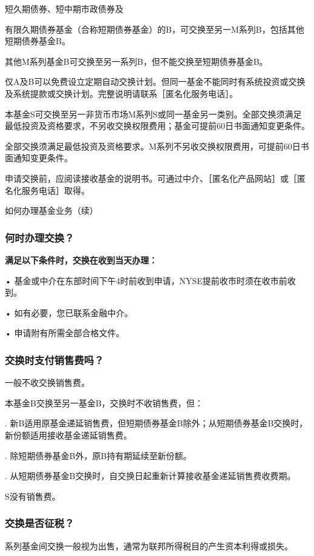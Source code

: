 \documentclass[UTF8,fontset=none,11pt,a4paper]{ctexart}
\begin{document}
短久期债券、短中期市政债券及

有限久期债券基金（合称短期债券基金）的B，可交换至另一M系列B，包括其他短期债券基金B。

其他M系列基金B可交换至另一系列B，但不能交换至短期债券基金B。

仅A及B可以免费设立定期自动交换计划。但同一基金不能同时有系统投资或交换及系统提款或交换计划。完整说明请联系［匿名化服务电话］。

本基金S可交换至另一非货币市场M系列S或同一基金另一类别。全部交换须满足最低投资及资格要求，不另收交换权限费用；基金可提前60日书面通知变更条件。

全部交换须满足最低投资及资格要求。M系列不另收交换权限费用，可提前60日书面通知变更条件。

申请交换前，应阅读接收基金的说明书。可通过中介、［匿名化产品网站］或［匿名化服务电话］取得。


\par{}\label{originalpage18}
如何办理基金业务（续）

\subsubsection*{何时办理交换？}
\textbf{满足以下条件时，交换在收到当天办理：}

\noindent • 基金或中介在东部时间下午4时前收到申请，NYSE提前收市时须在收市前收到。\par\smallskip
\noindent • 如有必要，您已联系金融中介。\par\smallskip
\noindent • 申请附有所需全部合格文件。\par\smallskip
\subsubsection*{交换时支付销售费吗？}
一般不收交换销售费。

本基金B交换至另一基金B，交换时不收销售费，但：

. 新B适用原基金递延销售费，但短期债券基金B除外；从短期债券基金B交换时，新份额适用接收基金递延销售费。


. 除短期债券基金B外，原B持有期延续至新份额。


. 从短期债券基金B交换时，自交换日起重新计算接收基金递延销售费收费期。


S没有销售费。

\subsubsection*{交换是否征税？}
系列基金间交换一般视为出售，通常为联邦所得税目的产生资本利得或损失。
\end{document}
